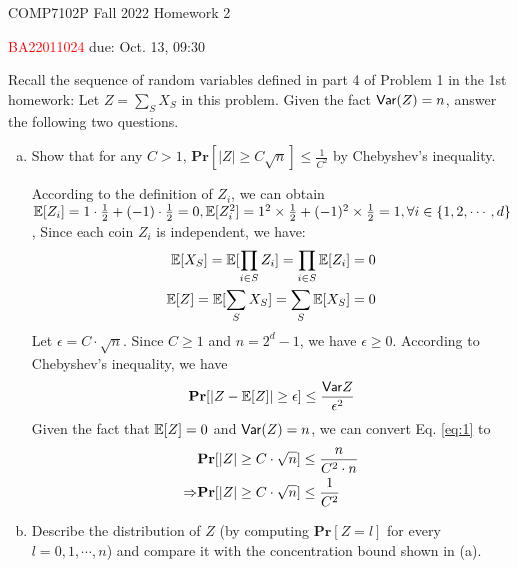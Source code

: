 



\noindent
\hspace*{.2in} COMP7102P Fall 2022
\hfill Homework 2\\
\begin{CJK}{UTF8}{gbsn}
    \hspace*{.2in} \textcolor{red}{BA22011024 \Name{} \ChineseName} \hfill due: Oct. 13, 09:30
\end{CJK}

\bigskip


\begin{problem}[15 points]
Recall the sequence of random variables defined in part 4 of Problem 1 in the 1st homework: Let $Z = \sum_{S}X_S$ in this problem. Given the fact $\mathsf{Var}(Z) = n$, answer the following two questions.

\begin{enumerate}[(a)]
\item Show that for any $C > 1$, $\mathbf{Pr}[|Z| \ge C\sqrt{n}] \le \frac{1}{C^2}$ by Chebyshev's inequality.

\Answer
According to the definition of $Z_i$, we can obtain $\operatorname*{\mathbb{E}}[Z_i] = 1 \cdot \frac{1}{2} + (-1) \cdot \frac{1}{2} = 0, \operatorname*{\mathbb{E}}[Z_i^2] = 1^2 \times \frac{1}{2} + (-1)^2 \times \frac{1}{2} = 1, \forall i \in \{1, 2, \cdots, d\}$,
Since each coin $Z_i$ is independent, we have:
\begin{align}
    \operatorname*{\mathbb{E}}[X_S] = \operatorname*{\mathbb{E}}[\prod_{i \in S} Z_i] = \prod_{i \in S} \operatorname*{\mathbb{E}}[Z_i] = 0\\
    \operatorname*{\mathbb{E}}[Z] = \operatorname*{\mathbb{E}}[\sum_{S} X_S] = \sum_{S}\operatorname*{\mathbb{E}}[X_S] = 0
\end{align}
Let $\epsilon = C \cdot \sqrt{n}$. Since $C \ge 1$ and $n=2^d -1$, we have $\epsilon \ge 0$. According to Chebyshev's inequality, we have 
\begin{align} \label{eq:1}
    \mathbf{Pr}[|Z - \operatorname*{\mathbb{E}}[Z]| \geq \epsilon] \le \frac{\mathsf{Var}{Z}}{\epsilon^2}
\end{align}
Given the fact that $\operatorname*{\mathbb{E}}[Z] = 0$ and $\mathsf{Var}(Z) = n$, we can convert Eq. \eqref{eq:1} to 
\begin{align}
    &\notag\mathbf{Pr}[|Z| \geq C \cdot \sqrt{n}] \le \frac{n}{C^2 \cdot n} \\
    \Rightarrow & \mathbf{Pr}[|Z| \geq C \cdot \sqrt{n}] \le \frac{1}{C^2}
\end{align}


\item Describe the distribution of $Z$ (by computing $\mathbf{Pr}[Z = l]$ for every $l = 0, 1, \cdots, n$) and compare it with the concentration bound shown in (a).


\end{enumerate}
\end{problem}

